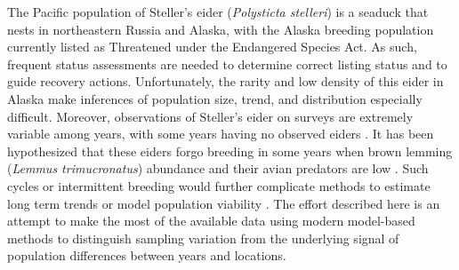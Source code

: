 \documentclass[
  10pt,
  letterpaper,
]{article}
\begin{document}
The Pacific population of Steller's eider (\emph{Polysticta stelleri})
is a seaduck that nests in northeastern Russia and Alaska, with the
Alaska breeding population currently listed as Threatened under the
Endangered Species Act. As such, frequent status assessments are needed
to determine correct listing status and to guide recovery actions.
Unfortunately, the rarity and low density of this eider in Alaska make
inferences of population size, trend, and distribution especially
difficult. Moreover, observations of Steller's eider on surveys are
extremely variable among years, with some years having no observed
eiders \citep{obritschkewitsch2008steller, wilson2025population}.
It has been hypothesized that these eiders forgo breeding in some years
when brown lemming (\emph{Lemmus trimucronatus}) abundance and
their avian predators are low \citep{quakenbush2004breeding}. Such
cycles or intermittent breeding would further complicate methods to
estimate long term trends or model population viability
\citep{dunham2017evaluating}. The effort described here is an attempt to
make the most of the available data using modern model-based methods to
distinguish sampling variation from the underlying signal of population
differences between years and locations.
\end{document}
